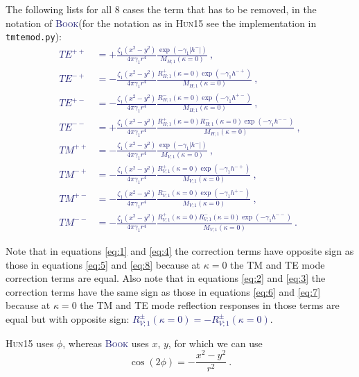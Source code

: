 \documentclass[fontsize=9pt, parskip=half, notitlepage, fleqn]{scrartcl}
\newcommand{\bkcol}[1]{\textcolor{MidnightBlue}{#1\xspace}}
\newcommand{\hun}{\textsc{Hun15}\xspace}
\newcommand{\book}{\bkcol{\textsc{Book}}\xspace}
\newcommand{\tmtemod}{\texttt{tmtemod.py}\xspace}
\begin{document}
The following lists for all 8 cases the term that has to be removed, in the
notation of \book (for the notation as in \hun see the implementation in
\tmtemod):
%
\bkcol{
\begin{align}
  TE^{++} &= + \frac{\zeta_1 (x^2-y^2)}{4\pi\gamma_1 r^4}
  \frac{\exp(-\gamma_1 |h^-|) }{M_{H;1}(\kappa=0)} \ ,
  \label{eq:1}\\
  TE^{-+} &= - \frac{\zeta_1 (x^2-y^2)}{4\pi\gamma_1 r^4}
  \frac{R^+_{H;1}(\kappa=0)\exp(-\gamma_1 h^{-+}) }{M_{H;1}(\kappa=0)}\ , 
  \label{eq:2}\\
  TE^{+-} &= - \frac{\zeta_1 (x^2-y^2)}{4\pi\gamma_1 r^4}
  \frac{R^-_{H;1}(\kappa=0)\exp(-\gamma_1 h^{+-}) }{M_{H;1}(\kappa=0)}\ , 
  \label{eq:3}\\
  TE^{--} &= + \frac{\zeta_1 (x^2-y^2)}{4\pi\gamma_1 r^4}
  \frac{R^+_{H;1}(\kappa=0)R^-_{H;1}(\kappa=0)\exp(-\gamma_1 h^{--}) }
  {M_{H;1}(\kappa=0)}\ , 
  \label{eq:4}\\
  TM^{++} &= - \frac{\zeta_1 (x^2-y^2)}{4\pi\gamma_1 r^4}
  \frac{\exp(-\gamma_1 |h^-|) }{M_{V;1}(\kappa=0)}\ , 
  \label{eq:5}\\
  TM^{-+} &= - \frac{\zeta_1 (x^2-y^2)}{4\pi\gamma_1 r^4}
  \frac{R^+_{V;1}(\kappa=0)\exp(-\gamma_1 h^{-+}) }{M_{V;1}(\kappa=0)}\ , 
  \label{eq:6}\\
  TM^{+-} &= - \frac{\zeta_1 (x^2-y^2)}{4\pi\gamma_1 r^4}
  \frac{R^-_{V;1}(\kappa=0)\exp(-\gamma_1 h^{+-}) }{M_{V;1}(\kappa=0)}\ , 
  \label{eq:7}\\
  TM^{--} &= - \frac{\zeta_1 (x^2-y^2)}{4\pi\gamma_1 r^4}
  \frac{R^+_{V;1}(\kappa=0)R^-_{V;1}(\kappa=0)\exp(-\gamma_1 h^{--}) }
  {M_{V;1}(\kappa=0)} \ .
  \label{eq:8}
\end{align}
}

Note that in equations \ref{eq:1} and \ref{eq:4} the correction terms have
opposite sign as those in equations \ref{eq:5} and \ref{eq:8} because at
$\kappa=0$ the TM and TE mode correction terms are equal. Also note that in
equations \ref{eq:2} and \ref{eq:3} the correction terms have the same sign as
those in equations \ref{eq:6} and \ref{eq:7} because at $\kappa=0$ the TM and
TE mode reflection responses in those terms are equal but with opposite sign:
\bkcol{$R^\pm_{V;1}(\kappa=0) = -R^\pm_{V;1}(\kappa=0)$}. 

\hun uses $\phi$, whereas \book uses $x$, $y$, for which we can use
%
\begin{equation}
  \cos(2\phi) = -\frac{x^2-y^2}{r^2} \ .
  \label{eq:phixy}
\end{equation}
\end{document}
